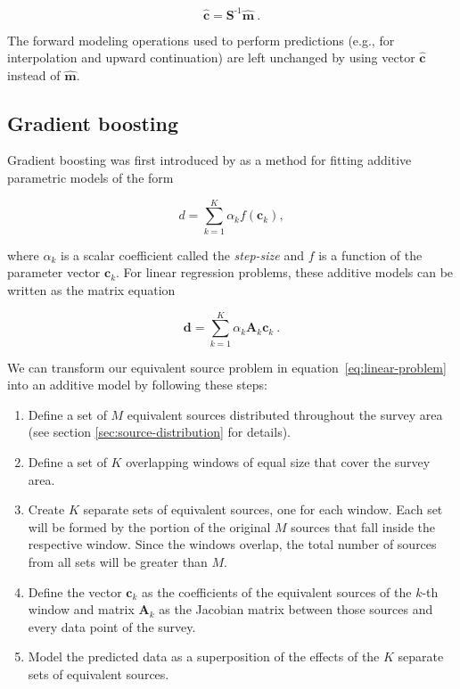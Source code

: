 \documentclass[twocolumn]{article}
\newcommand{\inv}{^{\text{-}1}}
\begin{document}
\begin{equation}
    \hat{\mathbf{c}} = \mathbf{S}\inv \hat{\mathbf{m}} \ .
\end{equation}

\noindent The forward modeling operations used to perform predictions
(e.g., for interpolation and upward continuation) are left unchanged by
using vector $\hat{\mathbf{c}}$ instead of $\hat{\mathbf{m}}$.


\subsection{Gradient boosting}

Gradient boosting was first introduced by \citet{friedman2001, friedman2002} as
a method for fitting additive parametric models of the form

\begin{equation}
  d = \sum_{k=1}^K \alpha_k f(\mathbf{c}_k),
\end{equation}

\noindent where $\alpha_k$ is a scalar coefficient called the \emph{step-size}
and $f$ is a function of the parameter vector $\mathbf{c}_k$.
For linear regression problems, these additive models can be written as the
matrix equation

\begin{equation}
    \mathbf{d} = \sum_{k=1}^K \alpha_k \mathbf{A}_k \mathbf{c}_k \ .
    \label{eq:gb-linear-model}
\end{equation}

We can transform our equivalent source problem in
equation~\ref{eq:linear-problem} into an additive model by following these
steps:

\begin{enumerate}
  \item Define a set of $M$ equivalent sources distributed throughout the
    survey area (see section \ref{sec:source-distribution} for details).
  \item Define a set of $K$ overlapping windows of equal size that cover the
    survey area.
  \item Create $K$ separate sets of equivalent sources, one for each window.
    Each set will be formed by the portion of the original $M$ sources that fall inside
    the respective window.
    Since the windows overlap, the total number of sources
    from all sets will be greater than $M$.
  \item Define the vector $\mathbf{c}_k$ as the coefficients of the equivalent
    sources of the $k$-th window and matrix $\mathbf{A}_k$ as the Jacobian
    matrix between those sources and every data point of the survey.
  \item Model the predicted data as a superposition of the effects of the $K$
    separate sets of equivalent sources.
\end{enumerate}
\end{document}
